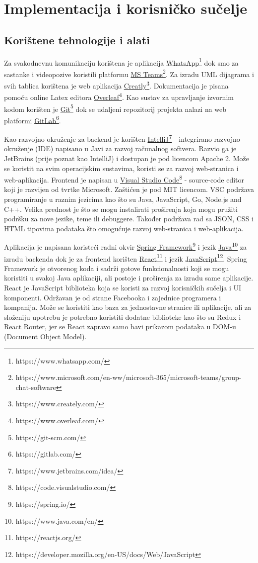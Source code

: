 \chapter{Implementacija i korisničko sučelje}
		
		
		\section{Korištene tehnologije i alati}
			
			\textit{}Za svakodnevnu komunikaciju korištena je aplikacija \underline{WhatsApp}\footnote[1]{https://www.whatsapp.com/} dok smo za sastanke i videopozive koristili platformu \underline{MS Teams}\footnote[2]{https://www.microsoft.com/en-ww/microsoft-365/microsoft-teams/group-chat-software}. Za izradu UML dijagrama i svih tablica korištena je web aplikacija \underline{Creatly}\footnote[3]{https://www.creately.com/}. Dokumentacija je pisana pomoću online Latex editora \underline{Overleaf}\footnote[4]{https://www.overleaf.com/}. Kao sustav za upravljanje izvornim kodom korišten je \underline{Git}\footnote[5]{https://git-scm.com/} dok se udaljeni repozitorij projekta nalazi na web platformi \underline{GitLab}\footnote[6]{https://gitlab.com/}.
			
			\textit{}Kao razvojno okruženje za backend je korišten \underline{IntelliJ}\footnote[7]{https://www.jetbrains.com/idea/} - integrirano razvojno okruženje (IDE) napisano u Javi za razvoj računalnog softvera. Razvio ga je JetBrains (prije poznat kao IntelliJ) i dostupan je pod licencom Apache 2. Može se koristit na svim operacijskim sustavima, koristi se za razvoj web-stranica i web-aplikacija. Frontend je napisan u \underline{Visual Studio Code}\footnote[8]{https://code.visualstudio.com/} - source-code editor koji je razvijen od tvrtke Microsoft. Zaštićen je pod MIT licencom. VSC podržava programiranje u raznim jezicima kao što su Java, JavaScript, Go, Node.js and C++. Velika prednost je što se mogu instalirati proširenja koja mogu pružiti podršku za nove jezike, teme ili debuggere. Također podržava rad sa JSON, CSS i HTML tipovima podataka što omogućuje razvoj web-stranica i web-aplikacija.
			
			\textit{}Aplikacija je napisana koristeći radni okvir \underline{Spring Framework}\footnote[9]{https://spring.io/} i jezik \underline{Java}\footnote[10]{https://www.java.com/en/} za izradu backenda dok je za frontend korišten \underline{React}\footnote[11]{https://reactjs.org/} i jezik \underline{JavaScript}\footnote[12]{https://developer.mozilla.org/en-US/docs/Web/JavaScript}. Spring Framework je otvorenog koda i sadrži gotove funkcionalnosti koji se mogu koristiti u svakoj Java aplikaciji, ali postoje i proširenja za izradu same aplikacije. React je JavaScript biblioteka koja se koristi za razvoj korisničkih sučelja i UI komponenti. Održavan je  od strane Facebooka i zajednice programera i kompanija. Može se koristiti kao baza za jednostavne stranice ili aplikacije, ali za složeniju upotrebu je potrebno koristiti dodatne biblioteke kao što su Redux i React Router, jer se React zapravo samo bavi prikazom podataka u DOM-u (Document Object Model).
			
